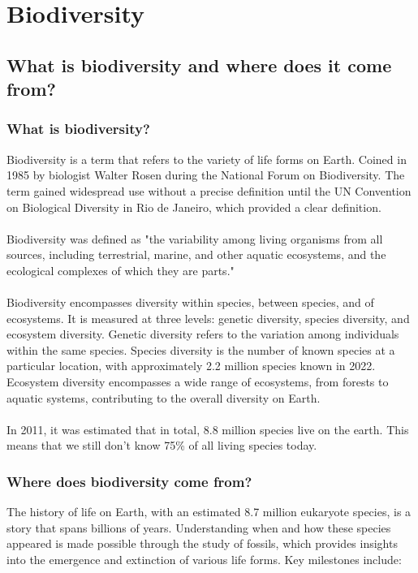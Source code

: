 \documentclass[../summary.tex]{subfiles}
\begin{document}
	
\section{Biodiversity}
\subsection{What is biodiversity and where does it come from?}
\subsubsection{What is biodiversity?}

Biodiversity is a term that refers to the variety of life forms on Earth. Coined in 1985 by biologist Walter Rosen during the National Forum on Biodiversity. The term gained widespread use without a precise definition until the UN Convention on Biological Diversity in Rio de Janeiro, which provided a clear definition. \\
\\
Biodiversity was defined as "the variability among living organisms from all sources, including terrestrial, marine, and other aquatic ecosystems, and the ecological complexes of which they are parts."\\
\\
Biodiversity encompasses diversity within species, between species, and of ecosystems. It is measured at three levels: genetic diversity, species diversity, and ecosystem diversity. Genetic diversity refers to the variation among individuals within the same species. Species diversity is the number of known species at a particular location, with approximately 2.2 million species known in 2022. Ecosystem diversity encompasses a wide range of ecosystems, from forests to aquatic systems, contributing to the overall diversity on Earth.\\
\\
In 2011, it was estimated that in total, 8.8 million species live on the earth. This means that we still don't know 75\% of all living species today.

\subsubsection{Where does biodiversity come from?}

The history of life on Earth, with an estimated 8.7 million eukaryote species, is a story that spans billions of years. Understanding when and how these species appeared is made possible through the study of fossils, which provides insights into the emergence and extinction of various life forms. Key milestones include:
\end{document}

